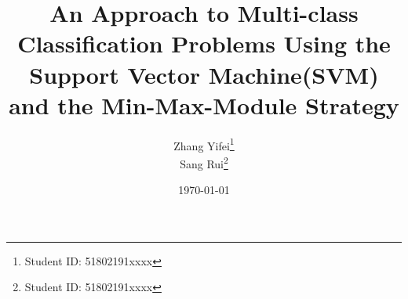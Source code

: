 \title{An Approach to Multi-class Classification Problems Using the Support Vector Machine(SVM) and the Min-Max-Module Strategy}

\author{Zhang Yifei\thanks{Student ID: \quad 51802191xxxx}\\
Sang Rui\thanks{Student ID: \quad 51802191xxxx}}

\date{\today}

